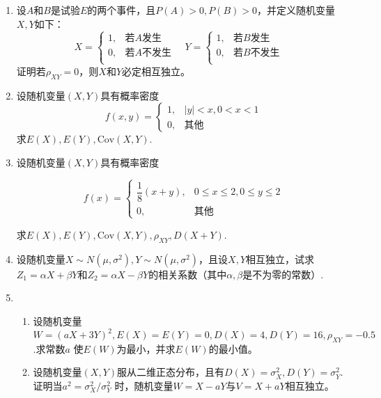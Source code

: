 \documentclass[10pt,a4paper]{article}
\begin{document}
\begin{enumerate}
    \item 设$A$和$B$是试验$E$的两个事件，且$P(A)>0,P(B)>0$，并定义随机变量$X,Y$如下：
    $$X=\left\{\begin{array}{ll}
        1, & \mbox{若}A\mbox{发生}\\
        0, & \mbox{若}A\mbox{不发生}\\
    \end{array}\right.\quad
    Y=\left\{\begin{array}{ll}
        1, & \mbox{若}B\mbox{发生}\\
        0, & \mbox{若}B\mbox{不发生}\\
    \end{array}\right.\quad$$
    证明若$\rho_{XY}=0$，则$X$和$Y$必定相互独立。


    \item 设随机变量$(X,Y)$具有概率密度
    $$f(x,y)=\left\{\begin{array}{ll}
        1, & |y|<x,0<x<1\\
        0, & \mbox{其他}
    \end{array}\right.$$
    求$E(X),E(Y),\mathrm{Cov}(X,Y)$.


    \item 设随机变量$(X,Y)$具有概率密度
    \vspace{-0.5cm}
    \begin{spacing}{2.0}
    $$f(x)=\left\{\begin{array}{ll}
        \dfrac{1}{8}(x+y), & 0\leq x\leq 2,0\leq y \leq 2\\
        0, & \mbox{其他}
    \end{array}\right.$$
    \end{spacing}
    \vspace{-0.5cm}
    求$E(X),E(Y),\mathrm{Cov}(X,Y),\rho_{XY},D(X+Y)$.


    \item 设随机变量$X\sim N(\mu,\sigma^2),Y\sim N(\mu,\sigma^2)$，且设$X,Y$相互独立，试求
    $Z_1=\alpha X+\beta Y$和$Z_2=\alpha X-\beta Y$的相关系数（其中$\alpha,\beta$是不为零的常数）.


    \item \begin{enumerate}
        \item 设随机变量$W=(aX+3Y)^2,E(X)=E(Y)=0,D(X)=4,D(Y)=16,\rho_{XY}=-0.5$.求常数$a$
        使$E(W)$为最小，并求$E(W)$的最小值。
        \item 设随机变量$(X,Y)$服从二维正态分布，且有$D(X)=\sigma_X^2,D(Y)=\sigma_Y^2$.证明当$a^2=\sigma^2_X/\sigma^2_Y$
        时，随机变量$W=X-aY$与$V=X+aY$相互独立。
    \end{enumerate}



\end{enumerate}
\end{document}
